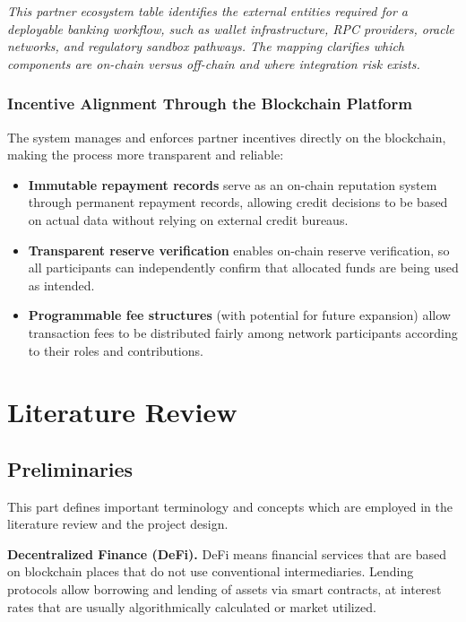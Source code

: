 \documentclass[12pt,a4paper]{report}  %
\begin{document}
\vspace{2pt}
\noindent\textit{\small This partner ecosystem table identifies the external entities required for a deployable banking workflow, such as wallet infrastructure, RPC providers, oracle networks, and regulatory sandbox pathways. The mapping clarifies which components are on-chain versus off-chain and where integration risk exists.}

\subsection{Incentive Alignment Through the Blockchain Platform}

The system manages and enforces partner incentives directly on the blockchain, making the process more transparent and reliable:

\begin{itemize}[noitemsep]
\item \textbf{Immutable repayment records} serve as an on-chain reputation system through permanent repayment records, allowing credit decisions to be based on actual data without relying on external credit bureaus.
\item \textbf{Transparent reserve verification} enables on-chain reserve verification, so all participants can independently confirm that allocated funds are being used as intended.
\item \textbf{Programmable fee structures} (with potential for future expansion) allow transaction fees to be distributed fairly among network participants according to their roles and contributions.
\end{itemize}


\chapter{Literature Review}

\section{Preliminaries}

This part defines important terminology and concepts which are employed in the literature review and the project design.

\hangindent=0.5in \textbf{Decentralized Finance (DeFi).} DeFi means financial services that are based on blockchain places that do not use conventional intermediaries. Lending protocols allow borrowing and lending of assets via smart contracts, at interest rates that are usually algorithmically calculated or market utilized.
\end{document}
